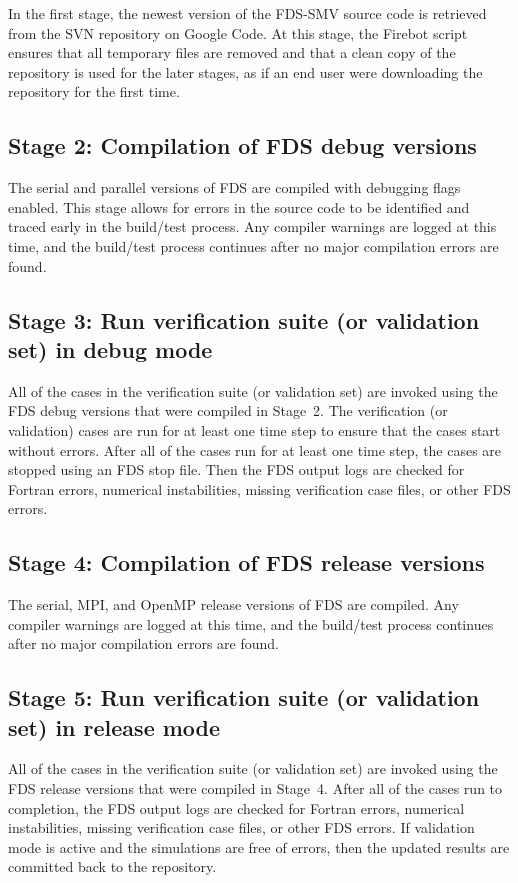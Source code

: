 \documentclass[11pt]{book}
\begin{document}
In the first stage, the newest version of the FDS-SMV source code is retrieved from the SVN repository on Google Code. At this stage, the Firebot script ensures that all temporary files are removed and that a clean copy of the repository is used for the later stages, as if an end user were downloading the repository for the first time.

\subsection*{Stage 2: Compilation of FDS debug versions}

The serial and parallel versions of FDS are compiled with debugging flags enabled. This stage allows for errors in the source code to be identified and traced early in the build/test process. Any compiler warnings are logged at this time, and the build/test process continues after no major compilation errors are found.

\subsection*{Stage 3: Run verification suite (or validation set) in debug mode}

All of the cases in the verification suite (or validation set) are invoked using the FDS debug versions that were compiled in Stage~2. The verification (or validation) cases are run for at least one time step to ensure that the cases start without errors. After all of the cases run for at least one time step, the cases are stopped using an FDS stop file. Then the FDS output logs are checked for Fortran errors, numerical instabilities, missing verification case files, or other FDS errors.

\subsection*{Stage 4: Compilation of FDS release versions}

The serial, MPI, and OpenMP release versions of FDS are compiled. Any compiler warnings are logged at this time, and the build/test process continues after no major compilation errors are found.

\subsection*{Stage 5: Run verification suite (or validation set) in release mode}

All of the cases in the verification suite (or validation set) are invoked using the FDS release versions that were compiled in Stage~4. After all of the cases run to completion, the FDS output logs are checked for Fortran errors, numerical instabilities, missing verification case files, or other FDS errors. If validation mode is active and the simulations are free of errors, then the updated results are committed back to the repository.
\end{document}
